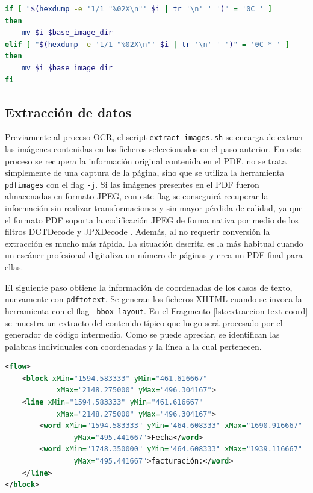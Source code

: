 \begin{lstlisting}[language=bash,caption={Detección del salto de página},label=lst:deteccion-salto-pagina]
if [ "$(hexdump -e '1/1 "%02X\n"' $i | tr '\n' ' ')" = '0C ' ]
then
    mv $i $base_image_dir
elif [ "$(hexdump -e '1/1 "%02X\n"' $i | tr '\n' ' ')" = '0C * ' ]
then
    mv $i $base_image_dir
fi
\end{lstlisting}

\subsection{Extracción de datos}

Previamente al proceso OCR, el script \verb|extract-images.sh| se encarga de extraer las imágenes contenidas en los ficheros seleccionados en el paso anterior. En este proceso se recupera la información original contenida en el PDF, no se trata simplemente de una captura de la página, sino que se utiliza la herramienta \verb|pdfimages| con el flag \verb|-j|. Si las imágenes presentes en el PDF fueron almacenadas en formato JPEG, con este flag se conseguirá recuperar la información sin realizar transformaciones y sin mayor pérdida de calidad, ya que el formato PDF soporta la codificación JPEG de forma nativa por medio de los filtros DCTDecode y JPXDecode \cite[23]{adobe_book_iso32000-1}. Además, al no requerir conversión la extracción es mucho más rápida. La situación descrita es la más habitual cuando un escáner profesional digitaliza un número de páginas y crea un PDF final para ellas.

El siguiente paso obtiene la información de coordenadas de los casos de texto, nuevamente con \verb|pdftotext|. Se generan los ficheros XHTML cuando se invoca la herramienta con el flag \verb|-bbox-layout|. En el Fragmento \ref{lst:extraccion-text-coord} se muestra un extracto del contenido típico que luego será procesado por el generador de código intermedio. Como se puede apreciar, se identifican las palabras individuales con coordenadas y la línea a la cual pertenecen.

\begin{lstlisting}[language=XML,caption={Extracción de texto con información de coordenadas},label=lst:extraccion-text-coord]
<flow>
    <block xMin="1594.583333" yMin="461.616667" 
            xMax="2148.275000" yMax="496.304167">
    <line xMin="1594.583333" yMin="461.616667" 
            xMax="2148.275000" yMax="496.304167">
        <word xMin="1594.583333" yMin="464.608333" xMax="1690.916667" 
                yMax="495.441667">Fecha</word>
        <word xMin="1748.350000" yMin="464.608333" xMax="1939.116667" 
                yMax="495.441667">facturación:</word>
    </line>
</block>
\end{lstlisting}


